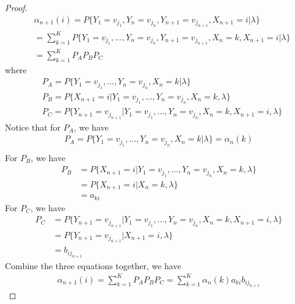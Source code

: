 \documentclass[runningheads]{llncs}
\begin{document}
    \subsection{}
    \begin{proof}
        \begin{align}
            &\alpha_{n+1}(i) 
            = P \{ Y_1 = v_{j_1}, Y_n = v_{j_n}, Y_{n+1} = v_{j_{n+1}}, X_{n+1} = i | \lambda \} \\
            &= \sum_{k=1}^K P \{ Y_1 = v_{j_1},..., Y_n = v_{j_n}, Y_{n+1} = v_{j_{n+1}}, X_{n} = k, X_{n+1} = i | \lambda \} \\
            &= \sum_{k=1}^K P_A P_B P_C
        \end{align}
        where
        \begin{align}
            &P_A = P \{ Y_1 = v_{j_1},..., Y_n = v_{j_n}, X_{n} = k | \lambda \} \\
            &P_B = P \{ X_{n+1} = i | Y_1 = v_{j_1},..., Y_n = v_{j_n}, X_{n} = k, \lambda \} \\ 
            &P_C = P \{ Y_{n+1} = v_{j_{n+1}} | Y_1 = v_{j_1},..., Y_n = v_{j_n}, X_{n} = k, X_{n+1} = i, \lambda\}
        \end{align}
        Notice that for $P_A$, we have
        \begin{align}
            P_A = P \{ Y_1 = v_{j_1},..., Y_n = v_{j_n}, X_{n} = k | \lambda \} = \alpha_n(k) \\
        \end{align}
        For $P_B$, we have
        \begin{align}
            P_B &= P \{ X_{n+1} = i | Y_1 = v_{j_1},..., Y_n = v_{j_n}, X_{n} = k, \lambda \} \\
            &= P \{ X_{n+1} = i | X_{n} = k, \lambda \} \\
            &= a_{ki}
        \end{align}
        For $P_C$, we have
        \begin{align}
            P_C &= P \{ Y_{n+1} = v_{j_{n+1}} | Y_1 = v_{j_1},..., Y_n = v_{j_n}, X_{n} = k, X_{n+1} = i, \lambda\} \\
            &= P \{ Y_{n+1} = v_{j_{n+1}} | X_{n+1} = i, \lambda\} \\
            &= b_{ij_{n+1}}
        \end{align}
        Combine the three equations together, we have
        \begin{align}
            \alpha_{n+1}(i) = \sum_{k=1}^K P_A P_B P_C = \sum_{k=1}^K \alpha_n(k) a_{ki} b_{ij_{n+1}}
        \end{align}
    \end{proof}
\end{document}
